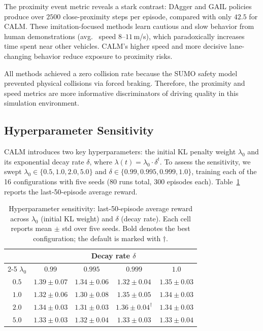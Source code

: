 \documentclass[journal]{IEEEtran}
\begin{document}
The proximity event metric reveals a stark contrast: DAgger and GAIL policies produce over $2500$ close-proximity steps per episode, compared with only $42.5$ for CALM. These imitation-focused methods learn cautious and slow behavior from human demonstrations (avg. \ speed $8$--$11$\,m/s), which paradoxically increases time spent near other vehicles. CALM's higher speed and more decisive lane-changing behavior reduce exposure to proximity risks.

All methods achieved a zero collision rate because the SUMO safety model prevented physical collisions via forced braking. Therefore, the proximity and speed metrics are more informative discriminators of driving quality in this simulation environment.

\subsection{Hyperparameter Sensitivity}

CALM introduces two key hyperparameters: the initial KL penalty weight $\lambda_0$ and its exponential decay rate $\delta$, where $\lambda(t) = \lambda_0 \cdot \delta^t$. To assess the sensitivity, we swept $\lambda_0 \in \{0.5, 1.0, 2.0, 5.0\}$ and $\delta \in \{0.99, 0.995, 0.999, 1.0\}$, training each of the 16 configurations with five seeds (80 runs total, 300 episodes each). Table~\ref{tab:ablation} reports the last-50-episode average reward.

\begin{table}[t]
\centering
\caption{Hyperparameter sensitivity: last-50-episode average reward across $\lambda_0$ (initial KL weight) and $\delta$ (decay rate). Each cell reports mean $\pm$ std over five seeds. Bold denotes the best configuration; the default is marked with $\dagger$.}
\label{tab:ablation}
\footnotesize
\begin{tabular}{c cccc}
\toprule
& \multicolumn{4}{c}{\textbf{Decay rate} $\delta$} \\
\cmidrule(lr){2-5}
$\lambda_0$ & $0.99$ & $0.995$ & $0.999$ & $1.0$ \\
\midrule
$0.5$ & $\mathbf{1.39 \pm 0.07}$ & $1.34 \pm 0.06$ & $1.32 \pm 0.04$ & $1.35 \pm 0.03$ \\
$1.0$ & $1.32 \pm 0.06$ & $1.30 \pm 0.08$ & $1.35 \pm 0.05$ & $1.34 \pm 0.03$ \\
$2.0$ & $1.34 \pm 0.03$ & $1.31 \pm 0.03$ & $1.36 \pm 0.04^\dagger$ & $1.34 \pm 0.03$ \\
$5.0$ & $1.33 \pm 0.03$ & $1.32 \pm 0.04$ & $1.33 \pm 0.03$ & $1.33 \pm 0.04$ \\
\bottomrule
\end{tabular}
\end{table}
\end{document}
